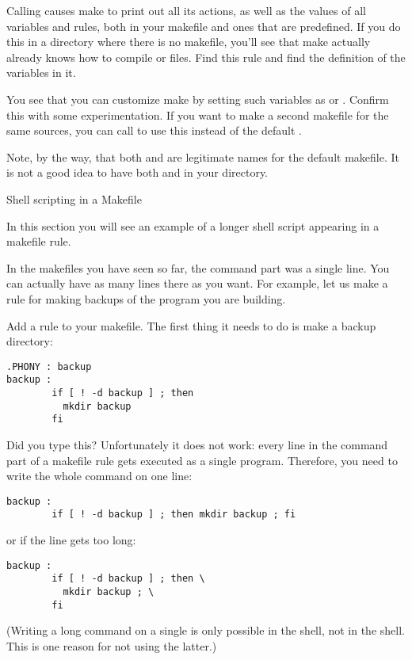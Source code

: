 Calling  causes make to print out all its
actions, as well as the values of all variables and rules, both in
your makefile and ones that are predefined. If you do this in a
directory where there is no makefile, you'll see that make actually
already knows how to compile  or  files. Find this rule
and find the definition of the variables in it.

You see that you can customize make by setting such variables as
 or . Confirm this with some experimentation. If
you want to make a second makefile for the same sources, you can call
 to use this instead of the default
.

Note, by the way, that both  and  are
legitimate names for the default makefile. It is not a good idea to
have both  and  in your directory.

 {Shell scripting in a Makefile}
\label{sec:make-shell}

\begin{purpose}
  In this section you will see an example of a longer shell script
  appearing in a makefile rule.
\end{purpose}

In the makefiles you have seen so far, the command part was a single
line. You can actually have as many lines there as you want.
For example, let us make a rule for making backups of the program you
are building.

Add a   rule to your makefile. The first thing it needs to
do is make a backup directory:
\begin{lstlisting}
.PHONY : backup
backup :
        if [ ! -d backup ] ; then 
          mkdir backup
        fi
\end{lstlisting}
Did you type this? Unfortunately it does not work: every line in the
command part of a makefile rule gets executed as a single
program. Therefore, you need to write the whole command on one line:
\begin{lstlisting}
backup :
        if [ ! -d backup ] ; then mkdir backup ; fi
\end{lstlisting}
or if the line gets too long:
\begin{lstlisting}
backup :
        if [ ! -d backup ] ; then \
          mkdir backup ; \
        fi
\end{lstlisting}
(Writing a long command on a single is only possible
in the  shell, not in the  shell.
This is one reason for not using the latter.)

